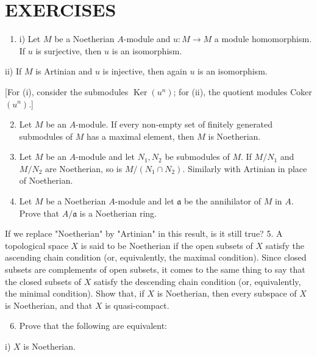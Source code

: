 \documentclass{standalone}
\theoremstyle{definition}
\theoremstyle{remark}
\begin{document}
\section{EXERCISES}
\begin{enumerate}
  \item i) Let $M$ be a Noetherian $A$-module and $u: M \rightarrow M$ a module homomorphism. If $u$ is surjective, then $u$ is an isomorphism.
\end{enumerate}

ii) If $M$ is Artinian and $u$ is injective, then again $u$ is an isomorphism.

[For (i), consider the submodules $\operatorname{Ker}\left(u^{n}\right)$; for (ii), the quotient modules Coker $\left(u^{n}\right)$.]

\begin{enumerate}
  \setcounter{enumi}{1}
  \item Let $M$ be an $A$-module. If every non-empty set of finitely generated submodules of $M$ has a maximal element, then $M$ is Noetherian.

  \item Let $M$ be an $A$-module and let $N_{1}, N_{2}$ be submodules of $M$. If $M / N_{1}$ and $M / N_{2}$ are Noetherian, so is $M /\left(N_{1} \cap N_{2}\right)$. Similarly with Artinian in place of Noetherian.

  \item Let $M$ be a Noetherian $A$-module and let $\mathfrak{a}$ be the annihilator of $M$ in $A$. Prove that $A / \mathfrak{a}$ is a Noetherian ring.

\end{enumerate}

If we replace "Noetherian" by "Artinian" in this result, is it still true? 5. A topological space $X$ is said to be Noetherian if the open subsets of $X$ satisfy the ascending chain condition (or, equivalently, the maximal condition). Since closed subsets are complements of open subsets, it comes to the same thing to say that the closed subsets of $X$ satisfy the descending chain condition (or, equivalently, the minimal condition). Show that, if $X$ is Noetherian, then every subspace of $X$ is Noetherian, and that $X$ is quasi-compact.

\begin{enumerate}
  \setcounter{enumi}{5}
  \item Prove that the following are equivalent:
\end{enumerate}

i) $X$ is Noetherian.
\end{document}
